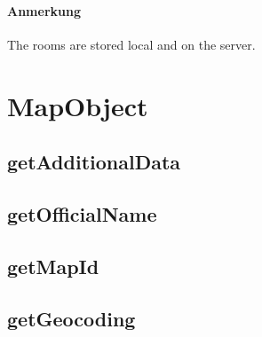 \paragraph*{Anmerkung}
The rooms are stored local and on the server.


\section{MapObject}
\subsection{getAdditionalData}
\subsection{getOfficialName}
\subsection{getMapId}
\subsection{getGeocoding}